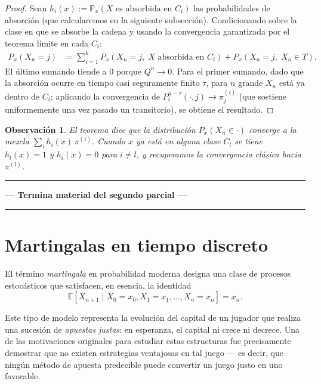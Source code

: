 \documentclass[12pt]{book}
\newtheorem{remark}{Observación}[chapter]
\begin{document}
\begin{proof}
    Sean $h_i(x) := \mathbb{P}_x(X \text{ es absorbida en } C_i)$ las probabilidades de absorción (que calcularemos en la siguiente subsección). Condicionando sobre la clase en que se absorbe la cadena y usando la convergencia garantizada por el teorema límite en cada $C_i$:
    \begin{align*}
        P_x(X_n = j)
        &= \sum_{i=1}^k P_x(X_n = j,\; X \text{ absorbida en } C_i) + P_x(X_n = j,\; X_n \in T).
    \end{align*}
    El último sumando tiende a $0$ porque $Q^n \to 0$. Para el primer sumando, dado que la absorción ocurre en tiempo casi seguramente finito $\tau$, para $n$ grande $X_n$ está ya dentro de $C_i$; aplicando la convergencia de $P_i^{n-\tau}(\cdot, j) \to \pi^{(i)}_j$ (que sostiene uniformemente una vez pasado un transitorio), se obtiene el resultado.
\end{proof}

\begin{remark}
    El teorema dice que la distribución $P_x(X_n \in \cdot)$ converge a la mezcla $\sum_i h_i(x)\,\pi^{(i)}$. Cuando $x$ ya está en alguna clase $C_l$ se tiene $h_l(x)=1$ y $h_i(x)=0$ para $i\ne l$, y recuperamos la convergencia clásica hacia $\pi^{(l)}$.
\end{remark}

\vspace{20pt}
\hrule
\vspace{10pt}
{
\color{blue}
\noindent\textbf{--- Termina material del segundo parcial ---}
}

\vspace{10pt}
\hrule
\vspace{20pt}


\chapter{Martingalas en tiempo discreto}

El término \emph{martingala} en probabilidad moderna designa una clase de procesos estocásticos que satisfacen, en esencia, la identidad
\[
    \mathbb{E}[X_{n+1} \mid X_0=x_0, X_1=x_1, \ldots, X_n=x_n] = x_n.
\]

Este tipo de modelo representa la evolución del capital de un jugador que realiza una sucesión de \emph{apuestas justas}: en esperanza, el capital ni crece ni decrece. Una de las motivaciones originales para estudiar estas estructuras fue precisamente demostrar que no existen estrategias ventajosas en tal juego — es decir, que ningún método de apuesta predecible puede convertir un juego justo en uno favorable.
\end{document}
